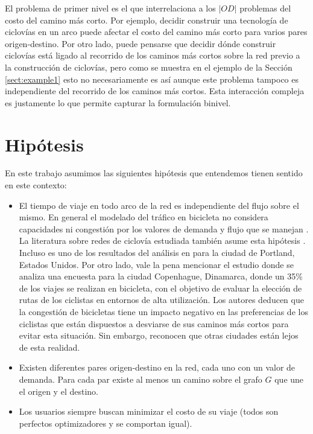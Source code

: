 El problema de primer nivel es el que interrelaciona a los $|OD|$ problemas del costo del camino más corto. Por ejemplo, decidir construir una tecnología de ciclovías en un arco puede afectar el costo del camino más corto para varios pares origen-destino. Por otro lado, puede pensarse que decidir dónde construir ciclovías está ligado al recorrido de los caminos más cortos sobre la red previo a la construcción de ciclovías, pero como se muestra en el ejemplo de la Sección \ref{sect:example1} esto no necesariamente es así aunque este problema tampoco es independiente del recorrido de los caminos más cortos. Esta interacción compleja es justamente lo que permite capturar la formulación binivel.

\section{Hipótesis}

En este trabajo asumimos las siguientes hipótesis que entendemos tienen sentido en este contexto:

\begin{itemize}
    \item{El tiempo de viaje en todo arco de la red es independiente del flujo sobre el mismo. En general el modelado del tráfico en bicicleta no considera capacidades ni congestión por los valores de demanda y flujo que se manejan \parencite{Sheffi1985}. La literatura sobre redes de ciclovía estudiada también asume esta hipótesis \parencite{Lin2013, Duthie2014, Liu2019, Zhu2019, baya2021}. Incluso es uno de los resultados del análisis en \parencite{broach2012} para la ciudad de Portland, Estados Unidos. Por otro lado, vale la pena mencionar el estudio \parencite{Vedel2017} donde se analiza una encuesta para la ciudad Copenhague, Dinamarca, donde un 35\% de los viajes se realizan en bicicleta, con el objetivo de evaluar la elección de rutas de los ciclistas en entornos de alta utilización. Los autores deducen que la congestión de bicicletas tiene un impacto negativo en las preferencias de los ciclistas que están dispuestos a desviarse de sus caminos más cortos para evitar esta situación. Sin embargo, reconocen que otras ciudades están lejos de esta realidad.}
  \item{Existen diferentes pares origen-destino en la red, cada uno con un valor de demanda. Para cada par existe al menos un camino sobre el grafo $G$ que une el origen y el destino.}
  \item{Los usuarios siempre buscan minimizar el costo de su viaje (todos son perfectos optimizadores y se comportan igual).}
\end{itemize}

